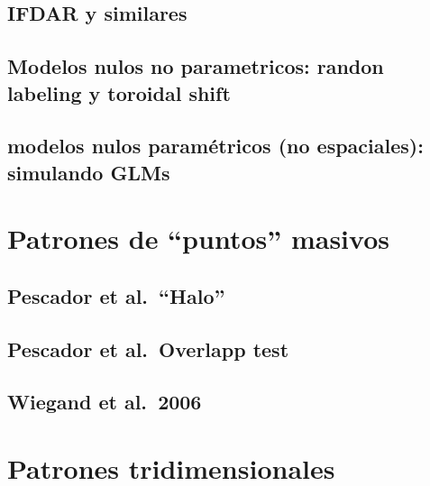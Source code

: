\documentclass[
  letterpaper,
  DIV=11,
  numbers=noendperiod]{scrreprt}
\begin{document}
\hypertarget{ifdar-y-similares}{%
\section{IFDAR y similares}\label{ifdar-y-similares}}

\hypertarget{modelos-nulos-no-parametricos-randon-labeling-y-toroidal-shift}{%
\section{Modelos nulos no parametricos: randon labeling y toroidal
shift}\label{modelos-nulos-no-parametricos-randon-labeling-y-toroidal-shift}}

\hypertarget{modelos-nulos-paramuxe9tricos-no-espaciales-simulando-glms-2}{%
\section{modelos nulos paramétricos (no espaciales): simulando
GLMs}\label{modelos-nulos-paramuxe9tricos-no-espaciales-simulando-glms-2}}


\hypertarget{patrones-de-puntos-masivos}{%
\chapter{Patrones de ``puntos''
masivos}\label{patrones-de-puntos-masivos}}

\hypertarget{pescador-et-al.-halo}{%
\section{Pescador et al.~``Halo''}\label{pescador-et-al.-halo}}

\hypertarget{pescador-et-al.-overlapp-test}{%
\section{Pescador et al.~Overlapp
test}\label{pescador-et-al.-overlapp-test}}

\hypertarget{wiegand-et-al.-2006}{%
\section{Wiegand et al.~2006}\label{wiegand-et-al.-2006}}


\hypertarget{patrones-tridimensionales}{%
\chapter{Patrones tridimensionales}\label{patrones-tridimensionales}}
\end{document}
